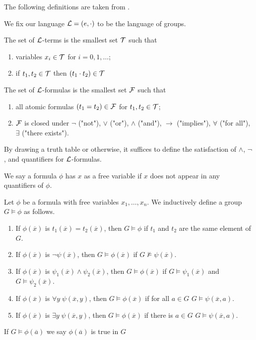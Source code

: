 \documentclass[../main.tex]{subfiles}
\begin{document}
The following definitions are taken from \cite{Marker2024}.

We fix our language $\mathcal{L}=(e,\cdot)$ to be the language of groups.

\begin{definition}
    The set of $\mathcal{L}$-terms is the smallest set $\mathcal{T}$ such that \begin{enumerate}
        \item variables $x_i\in\mathcal{T}$ for $i=0,1,\dots$;
        \item if $t_1,t_2\in \mathcal{T}$ then $(t_1 \cdot t_2)\in \mathcal{T}$
    \end{enumerate}
\end{definition}

\begin{definition}
    The set of $\mathcal{L}$-formulas is the smallest set $\mathcal{F}$ such that \begin{enumerate}
        \item all atomic formulas $(t_1=t_2)\in\mathcal{F}$ for $t_1,t_2\in \mathcal{T}$;
        \item $\mathcal{F}$ is closed under $\neg$ ("not"), $\vee$ ("or"), $\wedge$ ("and"), $\rightarrow$ ("implies"), $\forall$ ("for all"), $\exists$ ("there exists").
    \end{enumerate}
\end{definition}

By drawing a truth table or otherwise, it suffices to define the satisfaction of $\wedge$, $\neg$, and quantifiers for $\mathcal{L}$-formulas.

\begin{definition}
    We say a formula $\phi$ has $x$ as a free variable if $x$ does not appear in any quantifiers of $\phi$.
\end{definition}

\begin{definition}
    Let $\phi$ be a formula with free variables $x_1,\dots,x_n$. We inductively define a group $G\models \phi$ as follows. \begin{enumerate}
        \item If $\phi(\overline x)$ is $t_1(\overline x)=t_2(\overline x)$, then $G\models \phi$ if $t_1$ and $t_2$ are the same element of $G$.
        \item If $\phi(\overline x)$ is $\neg \psi(\overline x)$, then $G\models \phi(\overline x)$ if $G \nvDash \psi(\overline x)$.
        \item If $\phi(\overline x)$ is $\psi_1(\overline x) \wedge \psi_2(\overline x)$, then $G\models \phi(\overline x)$ if $G\models \psi_1(\overline x)$ and $G\models \psi_2(\overline x)$.
        \item If $\phi(\overline x)$ is $\forall y \; \psi(\overline x,y)$, then $G\models \phi(\overline x)$ if for all $a \in G$  $G\models \psi(\overline x, a)$.
        \item If $\phi(\overline x)$ is $\exists y \; \psi(\overline x,y)$, then $G\models \phi(\overline x)$ if there is $a \in G$  $G\models \psi(\overline x, a)$.
    \end{enumerate}

    If $G\models \phi(\overline a)$ we say $\phi(\overline a)$ is true in $G$
\end{definition}
\end{document}
